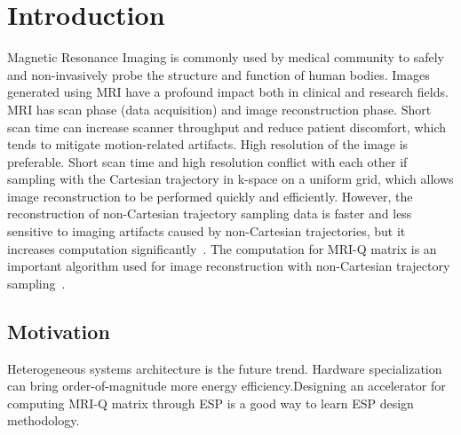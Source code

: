 \section{Introduction}
\label{sec:intro}

Magnetic Resonance Imaging is commonly used by medical community to safely and
non-invasively probe the structure and function of human bodies. Images
generated using MRI have a profound impact both in clinical and research
fields. MRI has scan phase (data acquisition) and image reconstruction
phase. Short scan time can increase scanner throughput and reduce patient
discomfort, which tends to mitigate motion-related artifacts. High resolution of
the image is preferable. Short scan time and high resolution conflict with each
other if sampling with the Cartesian trajectory in k-space on a uniform grid,
which allows image reconstruction to be performed quickly and
efficiently. However, the reconstruction of non-Cartesian trajectory sampling
data is faster and less sensitive to imaging artifacts caused by non-Cartesian
trajectories, but it increases computation
significantly~\cite{stone2008accelerating}. The computation for MRI-Q matrix is
an important algorithm used for image reconstruction with non-Cartesian
trajectory sampling~\cite{stratton2012parboil}.

\subsection{Motivation}

Heterogeneous systems architecture is the future trend. Hardware specialization
can bring order-of-magnitude more energy efficiency.Designing an accelerator for
computing MRI-Q matrix through ESP is a good way to learn ESP design
methodology.
